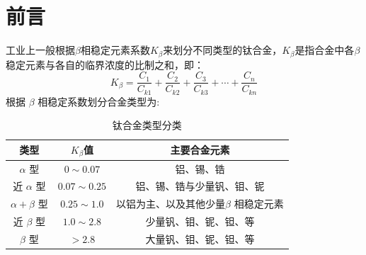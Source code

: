 \documentclass[
class = book,
zihao = -4,
font = noto,
paper = a4paper,
openany
]{easybook}
\newcommand{\ti}{Ti6Al4V}
\begin{document}
	\maketitle
	\frontmatter*[roman]

	\begin{abstract}
		\ti 合金又名TC4合金，拥有较好的塑韧性、耐热性、成形性、耐蚀性等，在机械、军事、航空航天等领域获得了极为广泛的应用。但TC4合金仍存在硬度较低、摩擦磨损系数高、耐磨性能差、较低的塑韧性和力学性能上的各向异性等缺点，制约了其进一步的应用。
		本文阐述了TC4钛合金的热处理工艺研究现状，并分析了不同热处理制度对Ti6Al4V合金强度的影响，并解析了组织转变的机理，为工程应用提供了有价值的参考，最后提出了TC4钛合金热处理工艺的研究方向。\\

	\end{abstract}

	\tableofcontents
	\mainmatter*
	\pagestyle{Xju}
\chapter{前言}
工业上一般根据$\beta $相稳定元素系数$K_{\beta}$来划分不同类型的钛合金，$K_{\beta}$是指合金中各$\beta $稳定元素与各自的临界浓度的比制之和，即：
$$
K_{\beta}=\frac{ C_{1} }{C_{k1}}+\frac{ C_{2} }{C_{k2}}+\frac{ C_{3} }{C_{k3}}+\cdots+\frac{ C_{n} }{C_{kn}}
$$
根据 $\beta$ 相稳定系数划分合金类型为:

\begin{table}[htbp]
	\centering
	\label{sec:sort}
	\caption{钛合金类型分类}
		\begin{tabular}{ccc}
			\toprule
			类型&$K_\beta$值&主要合金元素 \\
			\midrule
			 $\alpha$ 型& $0 \sim 0.07$&铝、锡、锆\\
			 近 $\alpha$ 型&$0.07 \sim 0.25$&铝、锡、锆与少量钒、钼、铌\\
			 $\alpha+\beta$ 型&$0.25 \sim 1.0$&以铝为主、以及其他少量$\beta$ 相稳定元素\\
			 近 $\beta$ 型&$1.0 \sim 2.8$&少量钒、钼、铌、钽、等\\
			$\beta$ 型&$ > 2.8 $&大量钒、钼、铌、钽、等\\
			\bottomrule
		\end{tabular}
\end{table}
\end{document}
